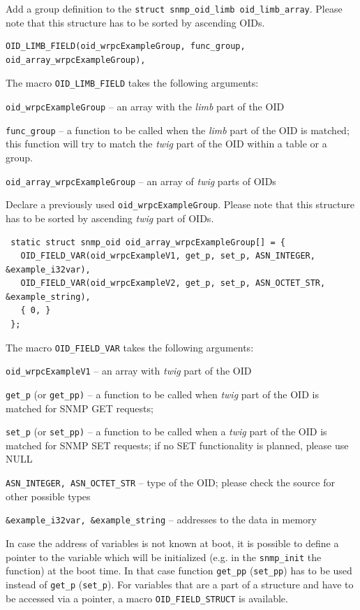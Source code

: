 \documentclass[a4paper, 12pt]{article}
\begin{document}
\begin{itemize*}
\item Add a group definition to the \texttt{struct snmp\_oid\_limb oid\_limb\_array}.
      Please note that this structure has to be sorted by ascending OIDs.
\begin{lstlisting}
OID_LIMB_FIELD(oid_wrpcExampleGroup, func_group, oid_array_wrpcExampleGroup),
\end{lstlisting}
The macro \texttt{OID\_LIMB\_FIELD} takes the following arguments:
\begin{itemize*}
   \item \texttt{oid\_wrpcExampleGroup} -- an array with the \textit{limb} part of the
         OID
   \item \texttt{func\_group} -- a function to be called when the \textit{limb} part of
         the OID is matched; this function will try to match the \textit{twig} part
         of the OID within a table or a group.
   \item \texttt{oid\_array\_wrpcExampleGroup} -- an array of \textit{twig} parts of OIDs
\end{itemize*}
\item Declare a previously used \texttt{oid\_wrpcExampleGroup}. Please note that
      this structure has to be sorted by ascending \textit{twig} part of OIDs.
\begin{lstlisting}
 static struct snmp_oid oid_array_wrpcExampleGroup[] = {
   OID_FIELD_VAR(oid_wrpcExampleV1, get_p, set_p, ASN_INTEGER,   &example_i32var),
   OID_FIELD_VAR(oid_wrpcExampleV2, get_p, set_p, ASN_OCTET_STR, &example_string),
   { 0, }
 };
\end{lstlisting}
The macro \texttt{OID\_FIELD\_VAR} takes the following arguments:
\begin{itemize*}
   \item \texttt{oid\_wrpcExampleV1} -- an array with \textit{twig} part of the OID
   \item \texttt{get\_p} (or \texttt{get\_pp)} -- a function to be called when \textit{twig}
         part of the OID is matched for SNMP GET requests;
   \item \texttt{set\_p} (or \texttt{set\_pp)} -- a function to be called when a \textit{twig}
         part of the OID is matched for SNMP SET requests; if no SET
         functionality is planned, please use NULL
   \item \texttt{ASN\_INTEGER, ASN\_OCTET\_STR} -- type of the OID; please
         check the source for other possible types
   \item \texttt{\&example\_i32var, \&example\_string} -- addresses to the data in
         memory
\end{itemize*}
In case the address of variables is not known at boot, it is possible to define
a pointer to the variable which will be initialized (e.g. in the \texttt{snmp\_init}
the function) at the boot time. In that case function \texttt{get\_pp} (\texttt{set\_pp}) has
to be used instead of \texttt{get\_p} (\texttt{set\_p}). For variables that are a part of
a structure and have to be accessed via a pointer, a macro \texttt{OID\_FIELD\_STRUCT}
is available.


\end{itemize*}
\end{document}
